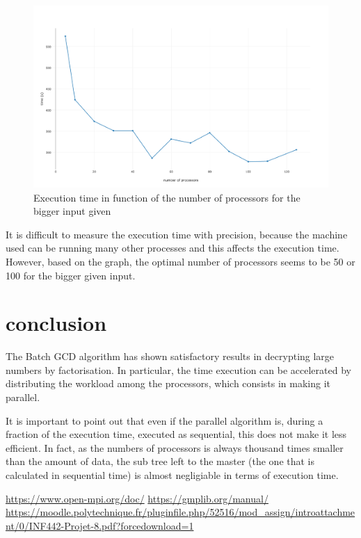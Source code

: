 \documentclass[a4paper,12pt]{article}
\begin{document}
	\begin{figure}[H]
		\centering
		\includegraphics[width=0.9\linewidth]{performance.png}
		\caption{Execution time in function of the number of processors for the bigger input given}
	\end{figure}

It is difficult to measure the execution time with precision, because the machine used can be running many other processes and this affects the execution time. However, based on the graph, the optimal number of processors seems to be 50 or 100 for the bigger given input.

\section{conclusion}
The Batch GCD algorithm has shown satisfactory results in decrypting large numbers by factorisation. In particular, the time execution can be  accelerated by distributing the workload among the processors, which consists in making it parallel.

It is important to point out that even if the parallel algorithm is, during a fraction of the execution time, executed as sequential, this does not make it less efficient. In fact, as the numbers of processors is always thousand times smaller than the amount of data, the sub tree left to the master (the one that is calculated in sequential time) is almost negligiable in terms of execution time. 

\begin{thebibliography}{3}
\bibitem{}
\url{https://www.open-mpi.org/doc/}
\bibitem{}
\url{https://gmplib.org/manual/}
\bibitem{}
\url{https://moodle.polytechnique.fr/pluginfile.php/52516/mod_assign/introattachment/0/INF442-Projet-8.pdf?forcedownload=1}


\end{thebibliography}
\end{document}
